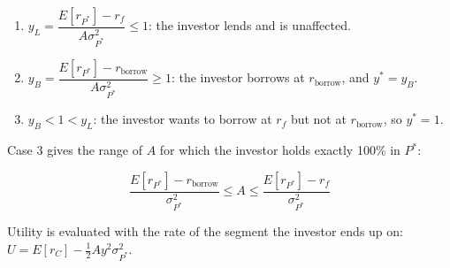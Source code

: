 \documentclass[11pt]{article}
\providecommand{\tightlist}{%
      \setlength{\itemsep}{0pt}\setlength{\parskip}{0pt}}
\begin{document}
\begin{enumerate}
\def\labelenumi{\arabic{enumi}.}
\tightlist
\item
  \(y_L = \dfrac{E[r_{P^*}] - r_f}{A\sigma_{P^*}^2} \le 1\): the
  investor lends and is unaffected.
\item
  \(y_B = \dfrac{E[r_{P^*}] - r_{\text{borrow}}}{A\sigma_{P^*}^2} \ge 1\):
  the investor borrows at \(r_{\text{borrow}}\), and \(y^* = y_B\).
\item
  \(y_B < 1 < y_L\): the investor wants to borrow at \(r_f\) but not at
  \(r_{\text{borrow}}\), so \(y^* = 1\).
\end{enumerate}

Case 3 gives the range of \(A\) for which the investor holds exactly
100\% in \(P^*\):

\[\frac{E[r_{P^*}] - r_{\text{borrow}}}{\sigma_{P^*}^2} \le A \le \frac{E[r_{P^*}] - r_f}{\sigma_{P^*}^2}\]

Utility is evaluated with the rate of the segment the investor ends up
on: \(U = E[r_C] - \tfrac{1}{2}A y^2 \sigma_{P^*}^2\).
\end{document}
